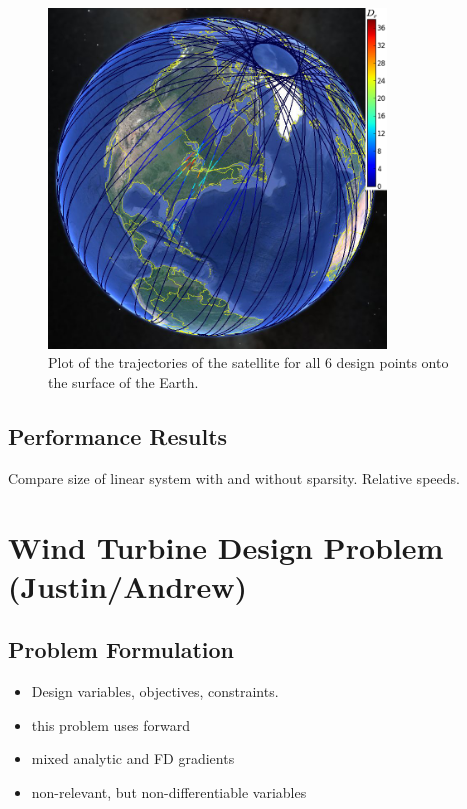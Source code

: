\documentclass[]{aiaa-tc} %
\begin{document}
        \begin{figure}
        \centering
        \includegraphics[width=0.8\textwidth]{images/allpts_gearth2}
        \caption[width=0.4\textwidth]{Plot of the trajectories of the satellite
        for all 6 design points onto the surface of the Earth.
        \label{allpt_g_earth}
        }
        
        \end{figure}

        \subsection{Performance Results}
            Compare size of linear system with and without sparsity. Relative speeds. 


  \section{Wind Turbine Design Problem (Justin/Andrew)}
    \subsection{Problem Formulation}
        \begin{itemize}
            \item Design variables, objectives, constraints. 
            \item this problem uses forward
            \item mixed analytic and FD gradients
            \item non-relevant, but non-differentiable variables 
        \end{itemize}
\end{document}
